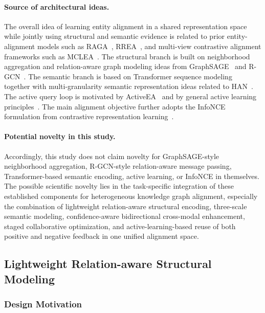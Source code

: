 \paragraph{Source of architectural ideas.}
The overall idea of learning entity alignment in a shared representation space while jointly using structural and semantic evidence is related to prior entity-alignment models such as RAGA~\cite{zhu2021raga}, RREA~\cite{mao2020rrea}, and multi-view contrastive alignment frameworks such as MCLEA~\cite{lin2022mclea}. The structural branch is built on neighborhood aggregation and relation-aware graph modeling ideas from GraphSAGE~\cite{hamilton2017graphsage} and R-GCN~\cite{schlichtkrull2018rgcn}. The semantic branch is based on Transformer sequence modeling~\cite{vaswani2017attention} together with multi-granularity semantic representation ideas related to HAN~\cite{yang2016han}. The active query loop is motivated by ActiveEA~\cite{liu2021activeea} and by general active learning principles~\cite{settles2009active}. The main alignment objective further adopts the InfoNCE formulation from contrastive representation learning~\cite{oord2018cpc}.

\paragraph{Potential novelty in this study.}
Accordingly, this study does not claim novelty for GraphSAGE-style neighborhood aggregation, R-GCN-style relation-aware message passing, Transformer-based semantic encoding, active learning, or InfoNCE in themselves. The possible scientific novelty lies in the task-specific integration of these established components for heterogeneous knowledge graph alignment, especially the combination of lightweight relation-aware structural encoding, three-scale semantic modeling, confidence-aware bidirectional cross-modal enhancement, staged collaborative optimization, and active-learning-based reuse of both positive and negative feedback in one unified alignment space.

\subsection{Lightweight Relation-aware Structural Modeling}

\subsubsection{Design Motivation}

